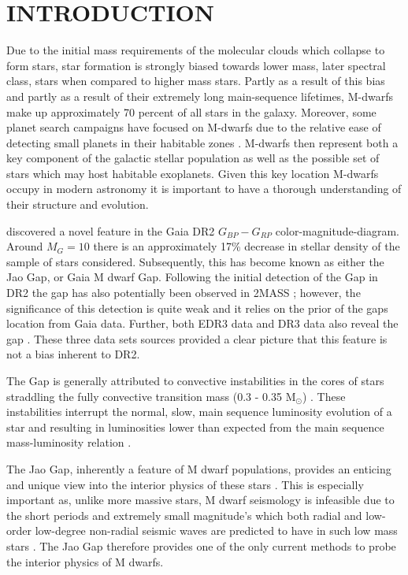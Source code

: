 \section{INTRODUCTION}\label{sec:intro}
Due to the initial mass requirements of the molecular clouds which collapse to form
stars, star formation is strongly biased towards lower mass, later spectral
class, stars when compared to higher mass stars. Partly as a result of this
bias and partly as a result of their extremely long main-sequence lifetimes,
M-dwarfs make up approximately 70 percent of all stars in the galaxy. Moreover,
some planet search campaigns have focused on M-dwarfs due to the relative ease
of detecting small planets in their habitable zones \citep[e.g.][]{Nut08}.
M-dwarfs then represent both a key component of the galactic stellar population
as well as the possible set of stars which may host habitable exoplanets.
Given this key location M-dwarfs occupy in modern astronomy it is important to
have a thorough understanding of their structure and evolution.

\citet{Jao2018} discovered a novel feature in the Gaia DR2 $G_{BP}-G_{RP}$
color-magnitude-diagram. Around $M_{G}=10$ there is an approximately 17\%
decrease in stellar density of the sample of stars \citeauthor{Jao2018}
considered. Subsequently, this has become known as either the Jao Gap, or Gaia
M dwarf Gap. Following the initial detection of the Gap in DR2 the gap has also
potentially been observed in 2MASS \citep{Skrutskie2006, Jao2018}; however, the
significance of this detection is quite weak and it relies on the prior of the gaps
location from Gaia data. Further, both EDR3 data and DR3 data also reveal the
gap \citep{Jao2021}. These three data sets sources provided a clear picture that this
feature is not a bias inherent to DR2.

The Gap is generally attributed to convective instabilities in the cores of
stars straddling the fully convective transition mass (0.3 - 0.35 M$_{\odot}$)
\citep{Baraffe2018}. These instabilities interrupt the normal, slow, main
sequence luminosity evolution of a star and resulting in luminosities lower
than expected from the main sequence mass-luminosity relation \citep{Jao2020}.

The Jao Gap, inherently a feature of M dwarf populations, provides an enticing
and unique view into the interior physics of these stars \citep{Feiden2021}.
This is especially important as, unlike more massive stars, M dwarf seismology
is infeasible due to the short periods and extremely small
magnitude's which both radial and low-order low-degree non-radial seismic waves
are predicted to have in such low mass stars \citep{Rodriguez-Lopez2019}. The
Jao Gap therefore provides one of the only current methods to probe the
interior physics of M dwarfs.

